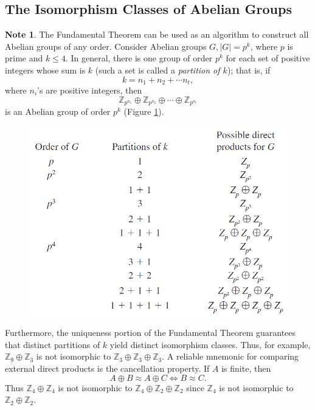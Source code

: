 \documentclass{article}
\theoremstyle{definition}
\newtheorem{note}{Note}[section]
\begin{document}
    \subsection{The Isomorphism Classes of Abelian Groups}
    \begin{note}
        The Fundamental Theorem can be used as an algorithm to construct all Abelian groups of any order. Consider Abelian groups $G,|G|=p^k$, where $p$ is prime and $k \leq 4$. In general, there is one group of order $p^k$ for each set of positive integers whose sum is $k$ (such a set is called a \textit{partition of $k$}); that is, if
        \begin{equation*}
            k=n_1+n_2+\cdots n_t,
        \end{equation*}
        where $n_i$'s are positive integers, then
        \begin{equation*}
            \mathbb{Z}_{p^{n_1}} \oplus \mathbb{Z}_{p^{n_2}} \oplus \cdots \oplus \mathbb{Z}_{p^{n_t}}
        \end{equation*}
        is an Abelian group of order $p^k$ (Figure \ref{sec11.2}).
        
        \begin{figure}[!htbp]
            \centering
            \includegraphics[width=0.75\linewidth]{figures/sec11.2.png}
            \caption{}
            \label{sec11.2}
        \end{figure}
        
        Furthermore, the uniqueness portion of the Fundamental Theorem guarantees that distinct partitions of $k$ yield distinct isomorphism classes. Thus, for example, $\mathbb{Z}_9 \oplus \mathbb{Z}_3$ is not isomorphic to $\mathbb{Z}_3 \oplus \mathbb{Z}_3 \oplus \mathbb{Z}_3$. A reliable mnemonic for comparing external direct products is the cancellation property. If $A$ is finite, then
        \begin{equation*}
            A \oplus B \approx A \oplus C \iff B \approx C.
        \end{equation*}
        Thus $\mathbb{Z}_4 \oplus \mathbb{Z}_4$ is not isomorphic to $\mathbb{Z}_4 \oplus \mathbb{Z}_2 \oplus \mathbb{Z}_2$ since $\mathbb{Z}_4$ is not isomorphic to $\mathbb{Z}_2 \oplus \mathbb{Z}_2$.
        

\end{note}
\end{document}
